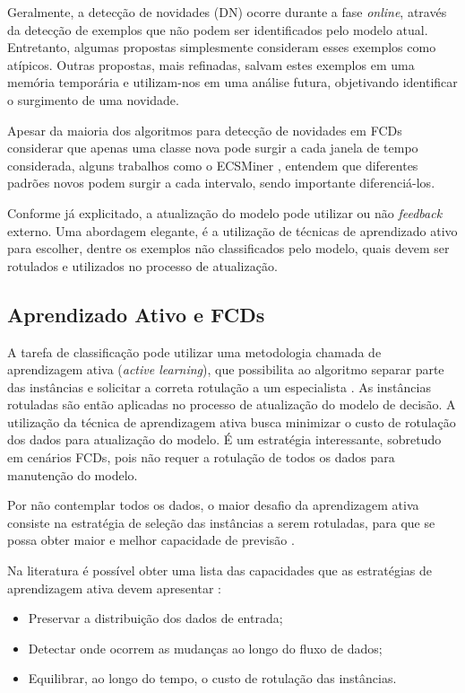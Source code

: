 \documentclass[qual, classic, a4paper]{ufbathesis}
\begin{document}
Geralmente, a detecção de novidades (DN) ocorre durante a fase \textit{online}, através da detecção de exemplos que não podem ser identificados pelo modelo atual. Entretanto, algumas propostas simplesmente consideram esses exemplos como atípicos. Outras propostas, mais refinadas, salvam estes exemplos em uma memória temporária e utilizam-nos em uma análise futura, objetivando identificar o surgimento de uma novidade.

Apesar da maioria dos algoritmos para detecção de novidades em FCDs considerar que apenas uma classe nova pode surgir a cada janela de tempo considerada, alguns trabalhos como o ECSMiner \cite{Masud:2010:ACC:1933307.1934606}, entendem que diferentes padrões novos podem surgir a cada intervalo, sendo importante diferenciá-los.

Conforme já explicitado, a atualização do modelo pode utilizar ou não \textit{feedback} externo. Uma abordagem elegante, é a utilização de técnicas de aprendizado ativo para escolher, dentre os exemplos não classificados pelo modelo, quais devem ser rotulados e utilizados no processo de atualização. 

\subsection{Aprendizado Ativo e FCDs}

A tarefa de classificação pode utilizar uma metodologia chamada de aprendizagem ativa (\textit{active learning}), que possibilita ao algoritmo separar parte das instâncias e solicitar a correta rotulação a um especialista \cite{Tong:2001}. As instâncias rotuladas são então aplicadas no processo de atualização do modelo de decisão.  A utilização da técnica de aprendizagem ativa busca minimizar o custo de rotulação dos dados para atualização do modelo. É um estratégia interessante, sobretudo em cenários FCDs, pois não requer a rotulação de todos os dados para manutenção do modelo.

Por não contemplar todos os dados, o maior desafio da aprendizagem ativa consiste na estratégia de seleção das instâncias a serem rotuladas, para que se possa obter maior e melhor capacidade de previsão \cite{Tong:2001}.

Na literatura é possível obter uma lista das capacidades que as estratégias de aprendizagem ativa devem apresentar \cite{Ienco:2014}: 

\begin{itemize}
    \item Preservar a distribuição dos dados de entrada;
    \item Detectar onde ocorrem as mudanças ao longo do fluxo de dados;
    \item Equilibrar, ao longo do tempo, o custo de rotulação das instâncias.
\end{itemize}
\end{document}
